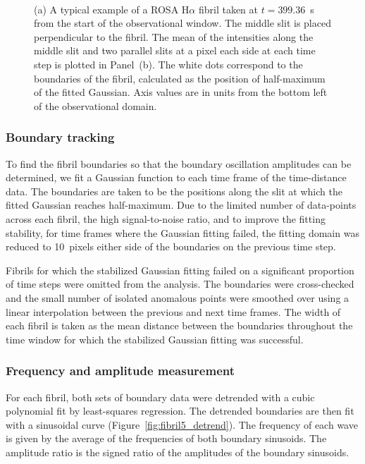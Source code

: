 \documentclass[12pt]{../style-files/ociamthesis}
\newcommand{\figdir}{../main/figures/chpt-4/} %
\begin{document}
\begin{figure}
	\centering
	 \\
	\caption{(a) A typical example of a ROSA H$\alpha$ fibril taken at $t=399.36$~s from the start of the observational window. The middle slit is placed perpendicular to the fibril. The mean of the intensities along the middle slit and two parallel slits at a pixel each side at each time step is plotted in Panel~(b). The white dots correspond to the boundaries of the fibril, calculated as the position of half-maximum of the fitted Gaussian. Axis values are in units from the bottom left of the observational domain.}
\end{figure}


\subsubsection{Boundary tracking} \label{sec:boundary tracking}

To find the fibril boundaries so that the boundary oscillation amplitudes can be determined, we fit a Gaussian function to each time frame of the time-distance data. The boundaries are taken to be the positions along the slit at which the fitted Gaussian reaches half-maximum. Due to the limited number of data-points across each fibril, the high signal-to-noise ratio, and to improve the fitting stability, for time frames where the Gaussian fitting failed, the fitting domain was reduced to 10~pixels either side of the boundaries on the previous time step.

Fibrils for which the stabilized Gaussian fitting failed on a significant proportion of time steps were omitted from the analysis. The boundaries were cross-checked and the small number of isolated anomalous points were smoothed over using a linear interpolation between the previous and next time frames. The width of each fibril is taken as the mean distance between the boundaries throughout the time window for which the stabilized Gaussian fitting was successful.


\subsubsection{Frequency and amplitude measurement} \label{sec:freq amp}
For each fibril, both sets of boundary data were detrended with a cubic polynomial fit by least-squares regression. The detrended boundaries are then fit with a sinusoidal curve (Figure~\ref{fig:fibril5_detrend}). The frequency of each wave is given by the average of the frequencies of both boundary sinusoids. The amplitude ratio is the signed ratio of the amplitudes of the boundary sinusoids.
\end{document}

